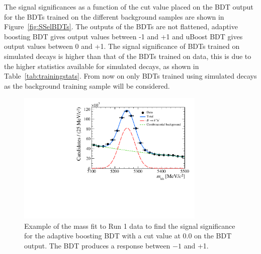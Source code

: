 The signal significances as a function of the cut value placed on the BDT output for the BDTs trained on the different background samples are shown in Figure~\ref{fig:SSelBDTs}. The outputs of the BDTs are not flattened, adaptive boosting BDT gives output values between -1 and +1 and uBoost BDT gives output values between 0 and +1. The signal significance of BDTs trained on simulated decays is higher than that of the BDTs trained on data, this is due to the higher statistics available for simulated decays, as shown in Table~\ref{tab:trainingstats}. %
From now on only BDTs trained using simulated decays as the background training sample will be considered.
\begin{figure}[htbp]
    \centering
        \includegraphics[width=0.8\textwidth]{./Figs/Selection/mass_example.pdf}
    \caption{Example of the mass fit to \bhh Run 1 data to find the signal significance for the adaptive boosting BDT with a cut value at 0.0 on the BDT output. The BDT produces a response between $-1$ and +1.}
    \label{fig:massEG}
\end{figure}

